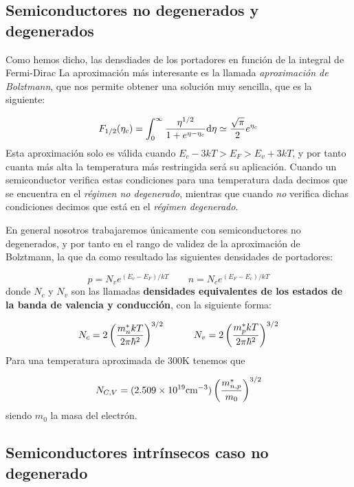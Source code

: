 \subsection{Semiconductores no degenerados y degenerados}

Como hemos dicho, las densdiades de los portadores en función de la integral de Fermi-Dirac
La aproximación más interesante es la llamada \textit{aproximación de Bolztmann}, que nos permite obtener una solución muy sencilla, que es la siguiente:

\begin{equation}
	F_{1/2} (\eta_c) = \int_{0}^{\infty} \frac{\eta^{1/2}}{1+ e^{\eta-\eta_c}} \mathrm{d} \eta \simeq \frac{\sqrt{\pi}}{2} e^{\eta_c} 
\end{equation}
Esta aproximación solo es válida cuando $E_c-3kT>E_F>E_v+3kT$, y por tanto cuanta más alta la temperatura más restringida será su aplicación. Cuando un semiconductor verifica estas condiciones para una temperatura dada decimos que se encuentra en el \textit{régimen no degenerado}, mientras que cuando \textit{no} verifica dichas condiciones decimos que está en el \textit{régimen degenerado}.

En general nosotros trabajaremos únicamente con semiconductores no degenerados, y por tanto en el rango de validez de la aproximación de Bolztmann, la que da como resultado las siguientes densidades de portadores:

\begin{equation}
	p=N_v e^{(E_v-E_F)/kT}  \qquad n = N_c e^{(E_F-E_c)/kT}
\end{equation}
donde $N_c$ y $N_v$ son las llamadas \textbf{densidades equivalentes de los estados de la banda de valencia y conducción}, con la siguiente forma:

\begin{equation}
	N_c = 2 \left( \frac{m_n^* kT}{2\pi\hbar^2} \right)^{3/2} \quad \quad \quad 
	N_v = 2 \left( \frac{m_p^* kT}{2\pi\hbar^2} \right)^{3/2}
\end{equation}
Para una temperatura aproximada de $300$K tenemos que 

\begin{equation}
	N_{C,V} = (2.509\times10^{19} \text{cm}^{-3}) \left( \frac{m_{n,p}^*}{m_0} \right)^{3/2}
\end{equation}
siendo $m_0$ la masa del electrón.
\subsection{Semiconductores intrínsecos caso no degenerado}

